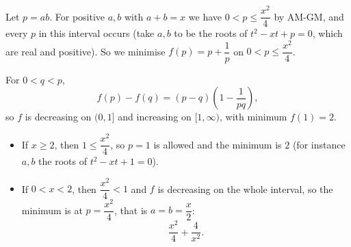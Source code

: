 Let $p=ab$. For positive $a,b$ with $a+b=x$ we have $0<p\le\dfrac{x^2}{4}$ by AM-GM, and every $p$ in this interval occurs (take $a,b$ to be the roots of $t^2-xt+p=0$, which are real and positive). So we minimise $f(p)=p+\dfrac{1}{p}$ on $0<p\le\dfrac{x^2}{4}$.

For $0<q<p$,
\[
f(p)-f(q)=(p-q)\left(1-\dfrac{1}{pq}\right),
\]
so $f$ is decreasing on $(0,1]$ and increasing on $[1,\infty)$, with minimum $f(1)=2$.
\begin{itemize}
\item If $x\ge2$, then $1\le\dfrac{x^2}{4}$, so $p=1$ is allowed and the minimum is $\boxed{2}$ (for instance $a,b$ the roots of $t^2-xt+1=0$).
\item If $0<x<2$, then $\dfrac{x^2}{4}<1$ and $f$ is decreasing on the whole interval, so the minimum is at $p=\dfrac{x^2}{4}$, that is $a=b=\dfrac {x}{2}$:
\[
\boxed{\dfrac{x^2}{4}+\dfrac{4}{x^2}} .
\]
\end{itemize}
